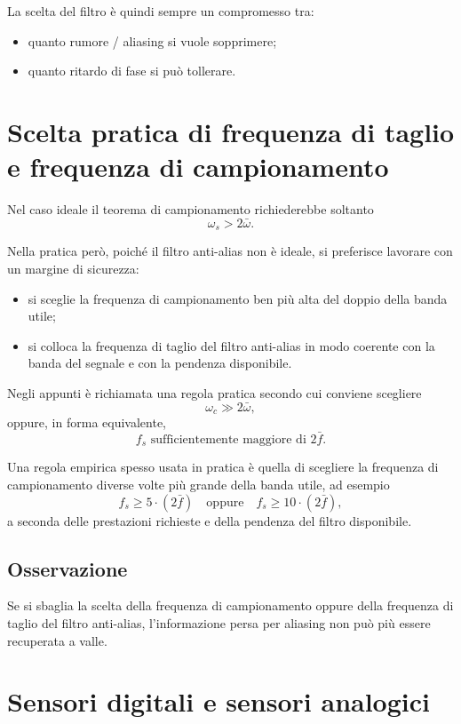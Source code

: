 La scelta del filtro è quindi sempre un compromesso tra:
\begin{itemize}
    \item quanto rumore / aliasing si vuole sopprimere;
    \item quanto ritardo di fase si può tollerare.
\end{itemize}

\section{Scelta pratica di frequenza di taglio e frequenza di campionamento}

Nel caso ideale il teorema di campionamento richiederebbe soltanto
\[
\omega_s>2\bar\omega.
\]

Nella pratica però, poiché il filtro anti-alias non è ideale, si preferisce lavorare
con un margine di sicurezza:
\begin{itemize}
    \item si sceglie la frequenza di campionamento ben più alta del doppio della banda utile;
    \item si colloca la frequenza di taglio del filtro anti-alias in modo coerente
    con la banda del segnale e con la pendenza disponibile.
\end{itemize}

Negli appunti è richiamata una regola pratica secondo cui conviene scegliere
\[
\omega_c \gg 2\bar\omega,
\]
oppure, in forma equivalente,
\[
f_s \text{ sufficientemente maggiore di } 2\bar f.
\]

Una regola empirica spesso usata in pratica è quella di scegliere la frequenza di campionamento
diverse volte più grande della banda utile, ad esempio
\[
f_s \ge 5\cdot (2\bar f)
\quad \text{oppure} \quad
f_s \ge 10\cdot (2\bar f),
\]
a seconda delle prestazioni richieste e della pendenza del filtro disponibile.

\subsection{Osservazione}

Se si sbaglia la scelta della frequenza di campionamento oppure della frequenza di taglio
del filtro anti-alias, l'informazione persa per aliasing non può più essere recuperata a valle.

\section{Sensori digitali e sensori analogici}

